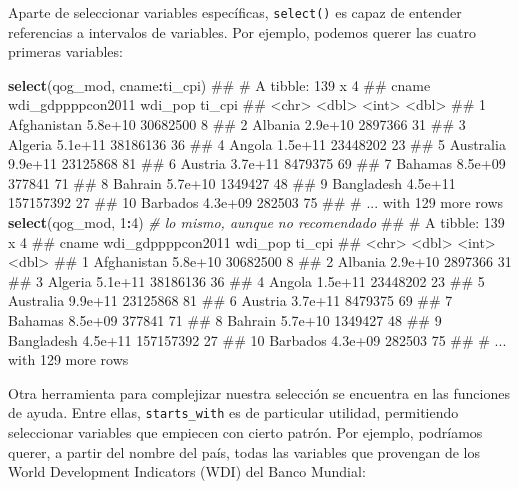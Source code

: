 \documentclass[]{book}
\newenvironment{Shaded}{\begin{snugshade}}{\end{snugshade}}
\newcommand{\KeywordTok}[1]{\textcolor[rgb]{0.13,0.29,0.53}{\textbf{#1}}}
\newcommand{\DecValTok}[1]{\textcolor[rgb]{0.00,0.00,0.81}{#1}}
\newcommand{\CommentTok}[1]{\textcolor[rgb]{0.56,0.35,0.01}{\textit{#1}}}
\newcommand{\OperatorTok}[1]{\textcolor[rgb]{0.81,0.36,0.00}{\textbf{#1}}}
\newcommand{\NormalTok}[1]{#1}
\begin{document}
Aparte de seleccionar variables específicas, \texttt{select()} es capaz
de entender referencias a intervalos de variables. Por ejemplo, podemos
querer las cuatro primeras variables:

\begin{Shaded}
\begin{Highlighting}[]
\KeywordTok{select}\NormalTok{(qog_mod, cname}\OperatorTok{:}\NormalTok{ti_cpi)}
\NormalTok{## # A tibble: 139 x 4}
\NormalTok{##          cname wdi_gdppppcon2011   wdi_pop ti_cpi}
\NormalTok{##          <chr>             <dbl>     <int>  <dbl>}
\NormalTok{##  1 Afghanistan           5.8e+10  30682500      8}
\NormalTok{##  2     Albania           2.9e+10   2897366     31}
\NormalTok{##  3     Algeria           5.1e+11  38186136     36}
\NormalTok{##  4      Angola           1.5e+11  23448202     23}
\NormalTok{##  5   Australia           9.9e+11  23125868     81}
\NormalTok{##  6     Austria           3.7e+11   8479375     69}
\NormalTok{##  7     Bahamas           8.5e+09    377841     71}
\NormalTok{##  8     Bahrain           5.7e+10   1349427     48}
\NormalTok{##  9  Bangladesh           4.5e+11 157157392     27}
\NormalTok{## 10    Barbados           4.3e+09    282503     75}
\NormalTok{## # ... with 129 more rows}
\KeywordTok{select}\NormalTok{(qog_mod, }\DecValTok{1}\OperatorTok{:}\DecValTok{4}\NormalTok{) }\CommentTok{# lo mismo, aunque no recomendado}
\NormalTok{## # A tibble: 139 x 4}
\NormalTok{##          cname wdi_gdppppcon2011   wdi_pop ti_cpi}
\NormalTok{##          <chr>             <dbl>     <int>  <dbl>}
\NormalTok{##  1 Afghanistan           5.8e+10  30682500      8}
\NormalTok{##  2     Albania           2.9e+10   2897366     31}
\NormalTok{##  3     Algeria           5.1e+11  38186136     36}
\NormalTok{##  4      Angola           1.5e+11  23448202     23}
\NormalTok{##  5   Australia           9.9e+11  23125868     81}
\NormalTok{##  6     Austria           3.7e+11   8479375     69}
\NormalTok{##  7     Bahamas           8.5e+09    377841     71}
\NormalTok{##  8     Bahrain           5.7e+10   1349427     48}
\NormalTok{##  9  Bangladesh           4.5e+11 157157392     27}
\NormalTok{## 10    Barbados           4.3e+09    282503     75}
\NormalTok{## # ... with 129 more rows}
\end{Highlighting}
\end{Shaded}

Otra herramienta para complejizar nuestra selección se encuentra en las
funciones de ayuda. Entre ellas, \texttt{starts\_with} es de particular
utilidad, permitiendo seleccionar variables que empiecen con cierto
patrón. Por ejemplo, podríamos querer, a partir del nombre del país,
todas las variables que provengan de los World Development Indicators
(WDI) del Banco Mundial:
\end{document}
